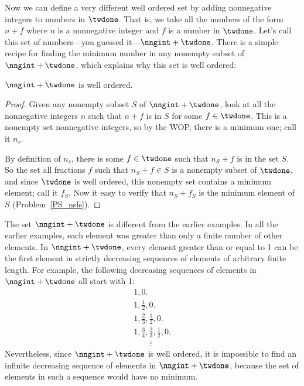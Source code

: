 Now we can define a very different well ordered set by adding
nonnegative integers to numbers in $\twdone$.  That is, we take all
the numbers of the form $n + f$ where $n$ is a nonnegative integer and
$f$ is a number in $\twdone$.  Let's call this set of numbers---you
guessed it---$\nngint + \twdone$.  There is a simple recipe for
finding the minimum number in any nonempty subset of $\nngint +
\twdone$, which explains why this set is well ordered:

\begin{lemma}\label{to1_well-order}
$\nngint + \twdone$ is well ordered.
\end{lemma}

\begin{proof}
Given any nonempty subset $S$ of $\nngint + \twdone$, look at all
the nonnegative integers $n$ such that $n+f$ is in $S$ for some $f
\in \twdone$.  This is a nonempty set nonnegative integers, so by the
WOP, there is a minimum one; call it $n_s$.

By definition of $n_s$, there is some $f \in \twdone$ such that
$n_S+f$ is in the set $S$.  So the set all fractions $f$ such that
$n_S+f \in S$ is a nonempty subset of $\twdone$, and since $\twdone$ is
well ordered, this nonempty set contains a minimum element; call it
$f_S$.  Now it easy to verify that $n_S+f_S$ is
the minimum element of $S$ (Problem~\ref{PS_nsfs}).
\end{proof}

The set $\nngint + \twdone$ is different from the earlier examples.
In all the earlier examples, each element was greater than
only a finite number of other elements.  In $\nngint + \twdone$, every
element greater than or equal to 1 can be the first element in
strictly decreasing sequences of elements of arbitrary finite length.
For example, the following decreasing sequences of elements in
$\nngint + \twdone$ all start with 1:
\[\begin{array}{l}
1, 0.\\
1, \frac12, 0.\\
1, \frac23, \frac12, 0.\\
1,  \frac34, \frac23, \frac12, 0.\\
\qquad\vdots
\end{array}\]
Nevertheless, since $\nngint + \twdone$ is well ordered, it is
impossible to find an infinite decreasing sequence of elements in
$\nngint + \twdone$, because the set of elements in such a sequence
would have no minimum.

\begin{problems}
\homeworkproblems
{}

\practiceproblems
{}

\classproblems
{}

\end{problems}
\endinput
